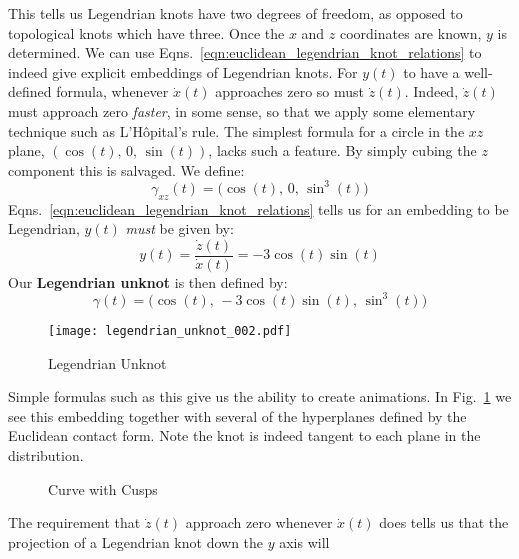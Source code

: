     This tells us Legendrian knots have two degrees of freedom, as opposed to
    topological knots which have three. Once the $x$ and $z$ coordinates are
    known, $y$ is determined. We can use
    Eqns.~\ref{eqn:euclidean_legendrian_knot_relations} to indeed give explicit
    embeddings of Legendrian knots. For $y(t)$ to have a well-defined formula,
    whenever $\dot{x}(t)$ approaches zero so must $\dot{z}(t)$. Indeed,
    $\dot{z}(t)$ must approach zero \textit{faster}, in some sense, so that
    we apply some elementary technique such as L'H\^{o}pital's rule. The
    simplest formula for a circle in the $xz$ plane,
    $(\cos(t),\,0,\,\sin(t))$, lacks such a feature. By simply
    cubing the $z$ component this is salvaged. We define:
    \begin{equation}
        \gamma_{xz}(t)=\big(\cos(t),\,0,\,\sin^{3}(t)\big)
    \end{equation}
    Eqns.~\ref{eqn:euclidean_legendrian_knot_relations} tells us for an
    embedding to be Legendrian, $y(t)$ \textit{must} be given by:
    \begin{equation}
        y(t)=\frac{\dot{z}(t)}{\dot{x}(t)}=-3\cos(t)\sin(t)
    \end{equation}
    Our \textbf{Legendrian unknot} is then defined by:
    \begin{equation}
        \gamma(t)=\big(
            \cos(t),\,
            -3\cos(t)\sin(t),\,
            \sin^{3}(t)
        \big)
    \end{equation}
    \begin{figure}
        \centering
        \texttt{[image: legendrian\_unknot\_002.pdf]}
        \caption{Legendrian Unknot}
        \label{fig:legendrian_unknot_002}
    \end{figure}
    Simple formulas such as this give us the ability to create animations. In
    Fig.~\ref{fig:legendrian_unknot_002} we see this embedding together with
    several of the hyperplanes defined by the Euclidean contact form. Note the
    knot is indeed tangent to each plane in the distribution.
    \par\hfill\par
    \begin{figure}
        \centering
        \caption{Curve with Cusps}
        \label{fig:cusps_in_the_plane_001}
    \end{figure}
    The requirement that $\dot{z}(t)$ approach zero whenever $\dot{x}(t)$ does
    tells us that the projection of a Legendrian knot down the $y$ axis will
